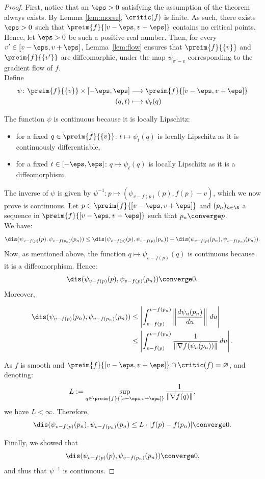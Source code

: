 \begin{proof}
First, notice that an $\eps>0$ satisfying the assumption of the theorem always exists. By Lemma \ref{lem:morse}, $\critic(f)$ is finite. As such, there exists $\eps>0$ such that $\preim{f}{[v-\eps,v+\eps]}$ contains no critical points. Hence, let $\eps>0$ be such a positive real number. Then, for every $v'\in[v-\eps,v+\eps]$, Lemma~\ref{lem:flow} ensures that $\preim{f}{\{v\}}$ and $\preim{f}{\{v'\}}$ are diffeomorphic, under the map $\psi_{v'-v}$ corresponding to the gradient flow of $f$.\\
Define 
\begin{align*}
\psi\colon \preim{f}{\{v\}}\times[-\eps,\eps] &\longrightarrow \preim{f}{[v-\eps,v+\eps]}  \\
(q,t)&\longmapsto \psi_{t}(q)
\end{align*}

The function $\psi$ is continuous because it is locally Lipschitz: 
\begin{itemize}
    \item for a fixed $q\in \preim{f}{\{v\}}$: $t\mapsto\psi_{t}(q)$ is locally Lipschitz as it is continuously differentiable,
    \item for a fixed $t\in [-\eps,\eps]$: $q\mapsto\psi_{t}(q)$ is locally Lipschitz as it is a diffeomorphism.
\end{itemize}
The inverse of $\psi$ is given by $\psi^{-1}\colon p \longmapsto (\psi_{v-f(p)}(p),f(p)-v)$, which we now prove is continuous. Let $p\in \preim{f}{[v-\eps,v+\eps]}$ and $(p_n)_{n\in\N}$ a sequence in $\preim{f}{[v-\eps,v+\eps]}$ such that $p_n\converge p$.\\
We have:
$$\dis(\psi_{v-f(p)}(p),\psi_{v-f(p_n)}(p_n))\leq \dis(\psi_{v-f(p)}(p),\psi_{v-f(p)}(p_n))+\dis(\psi_{v-f(p)}(p_n),\psi_{v-f(p_n)}(p_n)).$$
Now, as mentioned above, the function $q\mapsto\psi_{v-f(p)}(q)$ is continuous because it is a diffeomorphism. Hence:
$$\dis(\psi_{v-f(p)}(p),\psi_{v-f(p)}(p_n))\converge 0.$$
Moreover,

\begin{align*}
 \dis(\psi_{v-f(p)}(p_n),\psi_{v-f(p_n)}(p_n))&\leq \left|\int_{v-f(p)}^{v-f(p_n)}\left\Vert\frac{d\psi_{u}(p_n)}{du}\right\Vert\,du \right| \\
 &\leq \left|\int_{v-f(p)}^{v-f(p_n)}\frac{1}{\Vert\nabla f(\psi_{u}(p_n))\Vert}\,du \right|.
\end{align*}

As $f$ is smooth and $\preim{f}{[v-\eps,v+\eps]}\cap\critic(f)=\varnothing$, and  denoting:
$$L:=\sup_{q\in \preim{f}{[v-\eps,v+\eps]}}\frac{1}{\Vert\nabla f(q)\Vert},$$
we have $L<\infty$. Therefore,
$$\dis(\psi_{v-f(p)}(p_n),\psi_{v-f(p_n)}(p_n)\leq L\cdot |f(p)-f(p_n)|\converge 0.$$

Finally, we showed that $$\dis(\psi_{v-f(p)}(p),\psi_{v-f(p_n)}(p_n))\converge 0,$$ and thus that $\psi^{-1}$ is continuous.
\end{proof}



